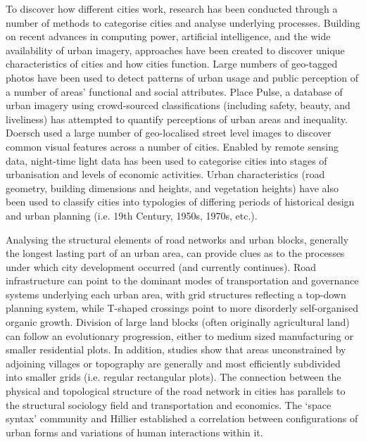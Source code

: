 \documentclass[9pt,twocolumn,twoside,lineno]{pnas-new}
\begin{document}
To discover how different cities work, research has been conducted through a number of methods to categorise cities and analyse underlying processes. Building on recent advances in computing power, artificial intelligence, and the wide availability of urban imagery, approaches have been created to discover unique characteristics of cities and how cities function. Large numbers of geo-tagged photos have been used to detect patterns of urban usage and public perception of a number of areas' functional and social attributes\cite{Liu2016,Zhou2014a}. Place Pulse, a database of urban imagery using crowd-sourced classifications (including safety, beauty, and liveliness) has attempted to quantify perceptions of urban areas\cite{Dubey2016,Naik2014} and inequality\cite{Salesses2013}. Doersch\cite{Doersch2012} used a large number of geo-localised street level images to discover common visual features across a number of cities. Enabled by remote sensing data, night-time light data has been used to categorise cities into stages of urbanisation and levels of economic activities\cite{Zhang2013}. Urban characteristics (road geometry, building dimensions and heights, and vegetation heights) have also been used to classify cities into typologies of differing periods of historical design and urban planning (i.e. 19th Century, 1950s, 1970s, etc.)\cite{Hermosilla2014}. 

Analysing the structural elements of road networks and urban blocks, generally the longest lasting part of an urban area, can provide clues as to the processes under which city development occurred (and currently continues)\cite{Porta2006a,Strano2012}. Road infrastructure can point to the dominant modes of transportation and governance systems underlying each urban area, with grid structures reflecting a top-down planning system\cite{Crouch1977,Courtat2011}, while T-shaped crossings point to more disorderly\cite{Jacobs1961} self-organised organic growth\cite{Cardillo2006}. Division of large land blocks (often originally agricultural land) can follow an evolutionary progression, either to medium sized manufacturing or smaller residential plots\cite{Fialkowski2008}. In addition, studies show that areas unconstrained by adjoining villages or topography are generally and most efficiently subdivided into smaller grids (i.e. regular rectangular plots)\cite{Strano2012}. The connection between the physical and topological structure of the road network in cities has parallels to the structural sociology field and transportation and economics. The `space syntax' community and Hillier\cite{Hillier1996} established a correlation between configurations of urban forms and variations of human interactions within it. 
\end{document}
